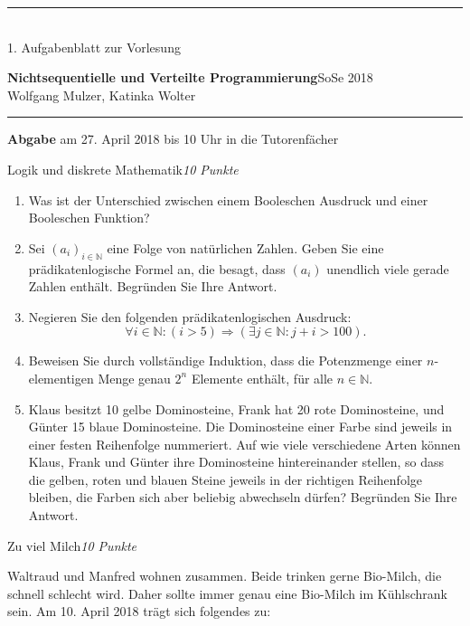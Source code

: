 \documentclass[a4paper,twoside,12pt]{article}
\newcommand{\ZETTELNUMMER}{1}
\newcommand{\ABGABEDATUM}{am 27. April 2018 bis 10 Uhr in die
  Tutorenf\"acher}
\newcounter{AUFGNR}
\newcommand{\AUFGABE}[2]{\vspace{0.3cm}\item[Aufgabe~\arabic{AUFGNR}]\stepcounter{AUFGNR} #1\hfill\emph{#2}}
\newcommand{\N}{\mathbb{N}}
\begin{document}
  \pagestyle{empty}
  \hrule\medskip
  \rule{0ex}{0ex}\\[-1ex]
  \ZETTELNUMMER. Aufgabenblatt zur Vorlesung

  \smallskip
  \noindent
  \large
  \textbf{Nichtsequentielle und Verteilte Programmierung}\hfill SoSe
  2018 \\[0.5ex]
  \normalsize
  Wolfgang Mulzer, Katinka Wolter

  \medskip\hrule

  \smallskip
  \noindent
  \textbf{Abgabe} \ABGABEDATUM

  \vskip 0.5cm


  \begin{description}
  \AUFGABE{Logik und diskrete Mathematik}{10 Punkte}

  \begin{enumerate}
  \item Was ist der Unterschied zwischen einem Booleschen
    Ausdruck und einer Booleschen Funktion?
  \item Sei $(a_i)_{i \in \N}$ eine Folge von nat\"urlichen Zahlen.
    Geben Sie eine pr\"adikatenlogische Formel an, die besagt,
    dass $(a_i)$ unendlich viele gerade Zahlen enth\"alt.
    Begr\"unden Sie Ihre Antwort.
  \item Negieren Sie den folgenden pr\"adikatenlogischen
    Ausdruck:
      \[
        \forall i \in \N: (i > 5) \Rightarrow (\exists j \in \N: j + i > 100).
      \]
  \item Beweisen Sie durch vollst\"andige Induktion, dass die Potenzmenge
    einer $n$-elementigen Menge genau $2^n$ Elemente enth\"alt, f\"ur alle
    $n \in \N$.
  \item Klaus besitzt 10 gelbe Dominosteine, Frank hat 20 rote
    Dominosteine, und G\"unter 15 blaue Dominosteine.
    Die Dominosteine einer Farbe sind jeweils in einer festen Reihenfolge
    nummeriert.
    Auf wie viele verschiedene Arten k\"onnen Klaus, Frank und G\"unter
    ihre Dominosteine hintereinander stellen, so dass die gelben, roten
    und blauen Steine jeweils in der richtigen Reihenfolge bleiben, die
    Farben sich aber beliebig abwechseln d\"urfen?
    Begr\"unden Sie Ihre Antwort.
  \end{enumerate}

  \AUFGABE{Zu viel Milch}{10 Punkte}

  Waltraud und Manfred wohnen zusammen.
  Beide trinken gerne Bio-Milch, die schnell schlecht wird.
  Daher sollte immer genau eine Bio-Milch im K\"uhlschrank sein.
  Am 10. April 2018 tr\"agt sich folgendes zu:
  \begin{verbatim}


\end{verbatim}
\end{description}
\end{document}
